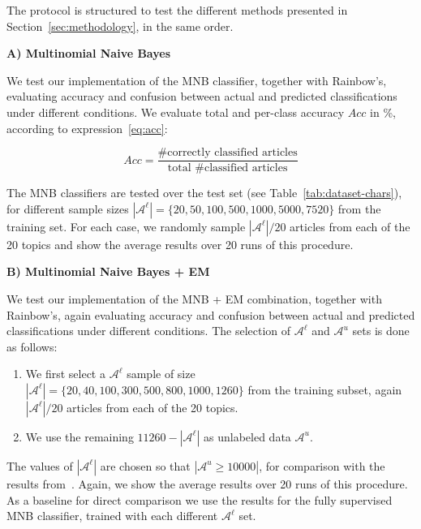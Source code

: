 The protocol is structured to test the different methods presented in 
Section~\ref{sec:methodology}, in the same order.\vertbreak

\textbf{A) Multinomial Naive Bayes}\vertbreak

We test our implementation of the MNB classifier, together with Rainbow's, 
evaluating accuracy and confusion between actual and predicted classifications 
under different conditions. We evaluate total and per-class accuracy $Acc$ in 
\%, according to expression~\ref{eq:acc}:

\begin{equation}
    Acc = \frac{\text{\# correctly classified articles}}{\text{total \# classified articles}}
    \label{eq:acc}
\end{equation}

The MNB classifiers are tested over the test set (see 
Table~\ref{tab:dataset-chars}), for different sample sizes 
$|\mathcal{A}^{\ell}| = \{20, 50, 100, 500, 1000, 5000, 7520\}$ from the training set. 
For each case, we randomly sample $|\mathcal{A}^{\ell}| / 20$ articles 
from each of the 20 topics and show the average results over 20 runs of this procedure.\vertbreak

\textbf{B) Multinomial Naive Bayes + EM}\vertbreak

We test our implementation of the MNB + EM combination, together with Rainbow's, 
again evaluating accuracy and confusion between actual and predicted classifications 
under different conditions. The selection of $\mathcal{A}^{\ell}$ and 
$\mathcal{A}^{u}$ sets is done as follows:

\begin{enumerate}

    \item We first select a $\mathcal{A}^{\ell}$ sample of size 
        $|\mathcal{A}^{\ell}| = \{20, 40, 100, 300, 500, 800, 1000, 1260\}$ from 
        the training subset, again $|\mathcal{A}^{\ell}| / 20$ articles 
        from each of the 20 topics.
    \item We use the remaining $11260 - |\mathcal{A}^{\ell}|$ as unlabeled 
        data $\mathcal{A}^{u}$.

\end{enumerate}

The values of $|\mathcal{A}^{\ell}|$ are chosen so that 
$|\mathcal{A}^{u} \ge 10000|$, for comparison with the results from~\cite{Nigam2000}. 
Again, we show the average results over 20 runs of this procedure. As a 
baseline for direct comparison we use the 
results for the fully supervised MNB classifier, trained with each different 
$\mathcal{A}^{\ell}$ set.\vertbreak

